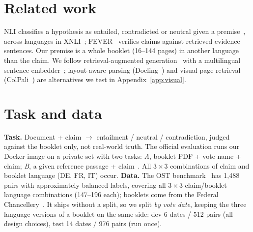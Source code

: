 \documentclass[10pt,a4paper]{article}
\begin{document}
\section{Related work}
NLI classifies a hypothesis as entailed, contradicted or neutral given a premise~\cite{bowman2015snli},
across languages in XNLI~\cite{conneau2018xnli}; FEVER~\cite{thorne2018fever} verifies claims against
retrieved evidence sentences. Our premise is a whole booklet (16--144 pages) in another language than the
claim. We follow retrieval-augmented generation~\cite{lewis2020rag} with a multilingual sentence
embedder~\cite{reimers2020}; layout-aware parsing (Docling~\cite{auer2024docling}) and visual page
retrieval (ColPali~\cite{faysse2024colpali}) are alternatives we test in Appendix~\ref{app:visual}.

\section{Task and data}
\textbf{Task.} Document + claim $\rightarrow$ entailment / neutral / contradiction, judged against the
booklet only, not real-world truth. The official evaluation runs our Docker image on a private set
with two tasks: \emph{A}, booklet PDF + vote name + claim; \emph{B}, a given reference passage +
claim~\cite{starter,ostslides}. All $3\times3$ combinations of claim and booklet language (DE, FR, IT) occur.
\textbf{Data.} The OST benchmark~\cite{ostdataset} has 1{,}488 pairs with approximately balanced
labels, covering all $3\times3$ claim/booklet language combinations (147--196 each); booklets come from the Federal Chancellery~\cite{booklets}. It ships without a split,
so we split \emph{by vote date}, keeping the three language versions of a booklet on the same side:
dev 6 dates / 512 pairs (all design choices), test 14 dates / 976 pairs (run once).
\end{document}
